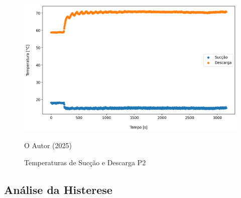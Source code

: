 \begin{figure}[h]
    \centering
    \includegraphics[width=1\linewidth]{FigurasdoTexto/Temperaturas de Sucção e Descarga P2.png}
    \caption{Temperaturas de Sucção e Descarga P2}
    \label{fig:Temperaturas de Sucção e Descarga P2}
    {\footnotesize O Autor (2025)}
\end{figure}

\subsection{Análise da Histerese}

